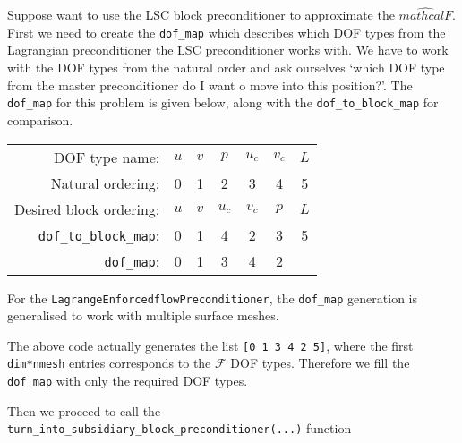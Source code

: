 Suppose want to use the LSC block preconditioner to approximate the $\hat{mathcal{F}}$. First we need to create the \verb+dof_map+ which describes which DOF types from the Lagrangian preconditioner the LSC preconditioner works with. We have to work with the DOF types from the natural order and ask ourselves `which DOF type from the master preconditioner do I want o move into this position?'. The \verb+dof_map+ for this problem is given below, along with the \verb+dof_to_block_map+ for comparison.
\begin{center}
    \begin{tabular}{ | r | c c c c c c |}
    \hline
    DOF type name:      & $u$ & $v$ & $p$ & $u_c$  & $v_c$ & $L$ \\ 
    Natural ordering:   & 0   &  1  &  2  &   3    &   4   &  5  \\ 
Desired block ordering: & $u$ & $v$ & $u_c$ & $v_c$& $p$   & $L$ \\ 
\verb+dof_to_block_map+:& 0   &  1  &  4  &   2    &   3   &  5  \\
\verb+dof_map+:         & 0   &  1  &  3  &   4    &   2   &     \\
    \hline
    \end{tabular}
\end{center}
For the \verb+LagrangeEnforcedflowPreconditioner+, the \verb+dof_map+ generation is generalised to work with multiple surface meshes.

The above code actually generates the list \verb+[0 1 3 4 2 5]+, where the first \verb+dim*nmesh+ entries corresponds to the $\mathcal{F}$ DOF types. Therefore we fill the \verb+dof_map+ with only the required DOF types.

Then we proceed to call the \verb+turn_into_subsidiary_block_preconditioner(...)+ function




